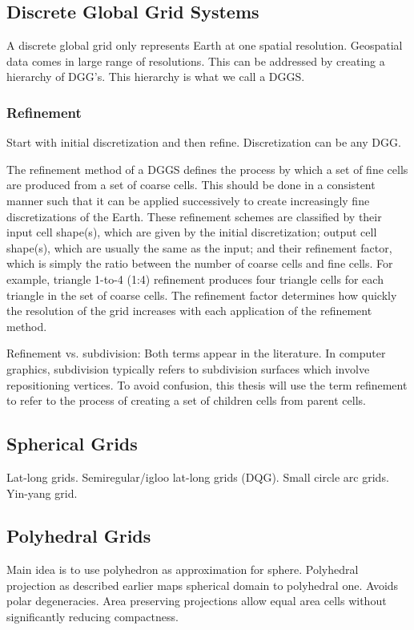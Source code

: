 \subsection{Discrete Global Grid Systems}
A discrete global grid only represents Earth at one spatial resolution.
Geospatial data comes in large range of resolutions.
This can be addressed by creating a hierarchy of DGG's.
This hierarchy is what we call a DGGS.


\subsubsection{Refinement}
Start with initial discretization and then refine.
Discretization can be any DGG.


The refinement method of a DGGS defines the process by which a set of fine cells are produced from a set of coarse cells.
This should be done in a consistent manner such that it can be applied successively to create increasingly fine discretizations of the Earth.
These refinement schemes are classified by their input cell shape(s), which are given by the initial discretization; output cell shape(s), which are usually the same as the input; and their refinement factor, which is simply the ratio between the number of coarse cells and fine cells.
For example, triangle 1-to-4 (1:4) refinement produces four triangle cells for each triangle in the set of coarse cells.
The refinement factor determines how quickly the resolution of the grid increases with each application of the refinement method.


Refinement vs. subdivision: Both terms appear in the literature.
In computer graphics, subdivision typically refers to subdivision surfaces which involve repositioning vertices.
To avoid confusion, this thesis will use the term refinement to refer to the process of creating a set of children cells from parent cells.


\subsection{Spherical Grids}
Lat-long grids.
Semiregular/igloo lat-long grids (DQG).
Small circle arc grids.
Yin-yang grid.
\cite{leopardi2006partition}
\cite{sun2008global}
\cite{song2002developing}
\cite{kageyama2004yin-yang}


\subsection{Polyhedral Grids}
Main idea is to use polyhedron as approximation for sphere.
Polyhedral projection as described earlier maps spherical domain to polyhedral one.
Avoids polar degeneracies.
Area preserving projections allow equal area cells without significantly reducing compactness.
\cite{fekete1990sphere}
\cite{dutton1996encoding}
\cite{gorski2005healpix}
\cite{holhocs2014octahedral}
\cite{mahdavi2013one} %
\cite{mahdavi2015hexagonal} %


